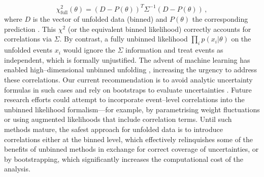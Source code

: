       \[
        \label{eq:chi2cov}
        \chi^2_{\text{full}}(\theta) = (D - P(\theta))^T \Sigma^{-1} (D - P(\theta))\,,
      \] 
        where $D$ is the vector of unfolded data (binned) and $P(\theta)$ the corresponding prediction .
        This $\chi^2$ (or the equivalent binned likelihood) correctly accounts for correlations via $\Sigma$.
        By contrast, a fully unbinned likelihood $\prod_i p(x_i|\theta)$ on the unfolded events $x_i$ would ignore the $\Sigma$ information and treat events as independent, which is formally unjustified.
        The advent of machine learning has enabled high--dimensional unbinned unfolding , increasing the urgency to address these correlations.
        Our current recommendation is to avoid analytic uncertainty formulas in such cases and rely on bootstraps to evaluate uncertainties .
        Future research efforts could attempt to incorporate event--level correlations into the unbinned likelihood formalism—for example, by parametrising weight fluctuations or using augmented likelihoods that include correlation terms.
        Until such methods mature, the safest approach for unfolded data is to introduce correlations either at the binned level, which effectively relinquishes some of the benefits of unbinned methods in exchange for correct coverage of uncertainties, or by bootstrapping, which significantly increases the computational cost of the analysis.

    
